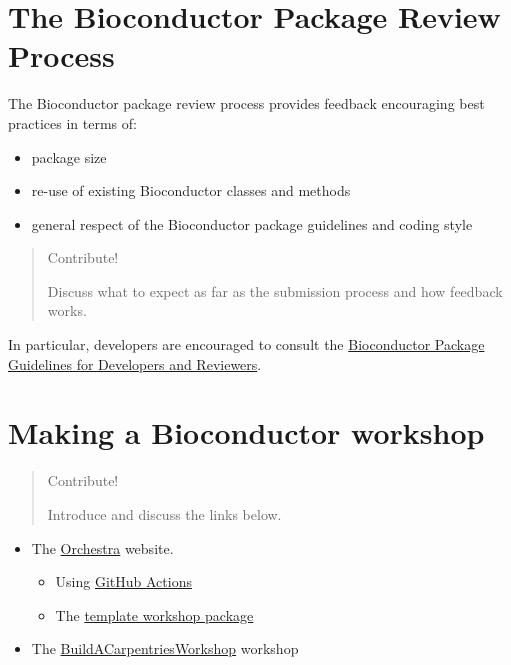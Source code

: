 \documentclass[
]{book}
\providecommand{\tightlist}{%
  \setlength{\itemsep}{0pt}\setlength{\parskip}{0pt}}
\begin{document}
\hypertarget{bioc-review}{%
\chapter{The Bioconductor Package Review Process}\label{bioc-review}}

The Bioconductor package review process provides feedback encouraging best practices in terms of:

\begin{itemize}
\tightlist
\item
  package size
\item
  re-use of existing Bioconductor classes and methods
\item
  general respect of the Bioconductor package guidelines and coding style
\end{itemize}

\begin{quote}
Contribute!

Discuss what to expect as far as the submission process and how feedback works.
\end{quote}

In particular, developers are encouraged to consult the \href{http://contributions.bioconductor.org/}{Bioconductor Package Guidelines for Developers and Reviewers}.

\hypertarget{bioc-workshop}{%
\chapter{Making a Bioconductor workshop}\label{bioc-workshop}}

\begin{quote}
Contribute!

Introduce and discuss the links below.
\end{quote}

\begin{itemize}
\tightlist
\item
  The \href{http://app.orchestra.cancerdatasci.org/}{Orchestra} website.

  \begin{itemize}
  \tightlist
  \item
    Using \href{https://github.com/features/actions}{GitHub Actions}
  \item
    The \href{https://github.com/seandavi/BuildABiocWorkshop}{template workshop package}
  \end{itemize}
\item
  The \href{https://github.com/jdrnevich/BuildACarpentriesWorkshop}{BuildACarpentriesWorkshop} workshop
\end{itemize}
\end{document}
